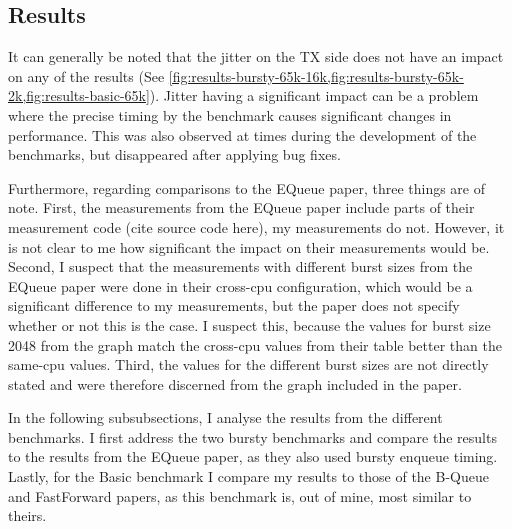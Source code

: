 \subsection{Results}
It can generally be noted that the jitter on the TX side does not have an impact on any of the results
(See \cref{fig:results-bursty-65k-16k,fig:results-bursty-65k-2k,fig:results-basic-65k}).
Jitter having a significant impact can be a problem where the precise timing by the benchmark causes significant changes in performance.
This was also observed at times during the development of the benchmarks, but disappeared after applying bug fixes.

Furthermore, regarding comparisons to the EQueue paper, three things are of note.
First, the measurements from the EQueue paper include parts of their measurement code (cite source code here), my measurements do not.
However, it is not clear to me how significant the impact on their measurements would be.
Second, I suspect that the measurements with different burst sizes from the EQueue paper were done in their cross-cpu configuration,
which would be a significant difference to my measurements, but the paper does not specify whether or not this is the case.
I suspect this, because the values for burst size 2048 from the graph match the cross-cpu values from their table better than the same-cpu values.
Third, the values for the different burst sizes are not directly stated and were therefore discerned from the graph included in the paper.

In the following subsubsections, I analyse the results from the different benchmarks.
I first address the two bursty benchmarks and compare the results to the results from the EQueue paper, as they also used bursty enqueue timing.
Lastly, for the Basic benchmark I compare my results to those of the B-Queue and FastForward papers, as this benchmark is, out of mine, most similar to theirs.






